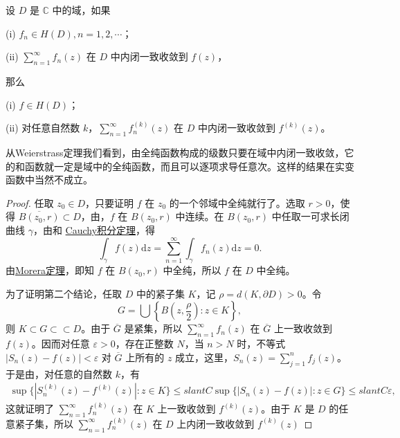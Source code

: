 \documentclass[../../main.tex]{subfiles}
\begin{document}
\begin{theorem}[Weierstrass定理]\label{theorem:Weierstrass定理}
设 \( D \) 是 \( \mathbb{C} \) 中的域，如果

(i) \( f_n \in H(D), n = 1, 2, \cdots \)；

(ii) \( \sum_{n=1}^{\infty} f_n(z) \) 在 \( D \) 中内闭一致收敛到 \( f(z) \)，

那么

(i) \( f \in H(D) \)；

(ii) 对任意自然数 \( k \)，\( \sum_{n=1}^{\infty} f_n^{(k)}(z) \) 在 \( D \) 中内闭一致收敛到 \( f^{(k)}(z) \)。
\end{theorem}
\begin{note}
从Weierstrass定理我们看到，由全纯函数构成的级数只要在域中内闭一致收敛，它的和函数就一定是域中的全纯函数，而且可以逐项求导任意次。这样的结果在实变函数中当然不成立。
\end{note}
\begin{proof}
任取 \( z_0 \in D \)，只要证明 \( f \) 在 \( z_0 \) 的一个邻域中全纯就行了。选取 \( r > 0 \)，使得 \( \overline{B(z_0, r)} \subset D \)，由，\( f \) 在 \( B(z_0, r) \) 中连续。在 \( B(z_0, r) \) 中任取一可求长闭曲线 \( \gamma \)，由和 \hyperref[theorem:Cauchy-Goursat定理(Cauchy积分定理)]{Cauchy积分定理}，得
\[
\int_{\gamma} f(z) \mathrm{d}z = \sum_{n=1}^{\infty} \int_{\gamma} f_n(z) \mathrm{d}z = 0.
\]
由\hyperref[theorem:Morera定理]{Morera定理}，即知 \( f \) 在 \( B(z_0, r) \) 中全纯，所以 \( f \) 在 \( D \) 中全纯。

为了证明第二个结论，任取 \( D \) 中的紧子集 \( K \)，记 \( \rho = d(K, \partial D) > 0 \)。令
\[
G = \bigcup\left\{ B\left(z, \frac{\rho}{2}\right) : z \in K \right\},
\]
则 \( K \subset G \subset\subset D \)。由于 \( \overline{G} \) 是紧集，所以 \( \sum_{n=1}^{\infty} f_n(z) \) 在 \( \overline{G} \) 上一致收敛到 \( f(z) \)。因而对任意 \( \varepsilon > 0 \)，存在正整数 \( N \)，当 \( n > N \) 时，不等式 \( |S_n(z) - f(z)| < \varepsilon \) 对 \( \overline{G} \) 上所有的 \( z \) 成立，这里，\( S_n(z) = \sum_{j=1}^{n} f_j(z) \)。于是由，对任意的自然数 \( k \)，有
\begin{align*}
\sup\{|S_n^{(k)}(z) - f^{(k)}(z)| : z \in K\} \leqslant slant C\sup\{|S_n(z) - f(z)| : z \in G\} \leqslant slant C\varepsilon,
\end{align*}
这就证明了 \( \sum_{n=1}^{\infty} f_n^{(k)}(z) \) 在 \( K \) 上一致收敛到 \( f^{(k)}(z) \)。由于 \( K \) 是 \( D \) 的任意紧子集，所以 \( \sum_{n=1}^{\infty} f_n^{(k)}(z) \) 在 \( D \) 上内闭一致收敛到 \( f^{(k)}(z) \)
\end{proof}
\end{document}
